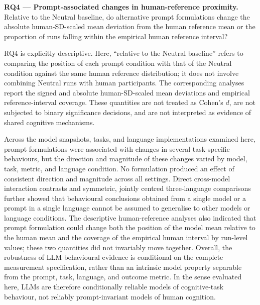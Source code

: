 \documentclass[logo,msc]{infthesis}
\begin{document}
\noindent\textbf{RQ4 --- Prompt-associated changes in human-reference proximity.}
Relative to the Neutral baseline, do alternative prompt formulations change the absolute human-SD-scaled mean deviation from the human reference mean or the proportion of runs falling within the empirical human reference interval?

RQ4 is explicitly descriptive. Here, ``relative to the Neutral baseline'' refers to comparing the position of each prompt condition with that of the Neutral condition against the same human reference distribution; it does not involve combining Neutral runs with human participants. The corresponding analyses report the signed and absolute human-SD-scaled mean deviations and empirical reference-interval coverage. These quantities are not treated as Cohen's \(d\), are not subjected to binary significance decisions, and are not interpreted as evidence of shared cognitive mechanisms.

Across the model snapshots, tasks, and language implementations examined here, prompt formulations were associated with changes in several task-specific behaviours, but the direction and magnitude of these changes varied by model, task, metric, and language condition. No formulation produced an effect of consistent direction and magnitude across all settings. Direct cross-model interaction contrasts and symmetric, jointly centred three-language comparisons further showed that behavioural conclusions obtained from a single model or a prompt in a single language cannot be assumed to generalise to other models or language conditions. The descriptive human-reference analyses also indicated that prompt formulation could change both the position of the model mean relative to the human mean and the coverage of the empirical human interval by run-level values; these two quantities did not invariably move together. Overall, the robustness of LLM behavioural evidence is conditional on the complete measurement specification, rather than an intrinsic model property separable from the prompt, task, language, and outcome metric. In the sense evaluated here, LLMs are therefore conditionally reliable models of cognitive-task behaviour, not reliably prompt-invariant models of human cognition.
\end{document}
